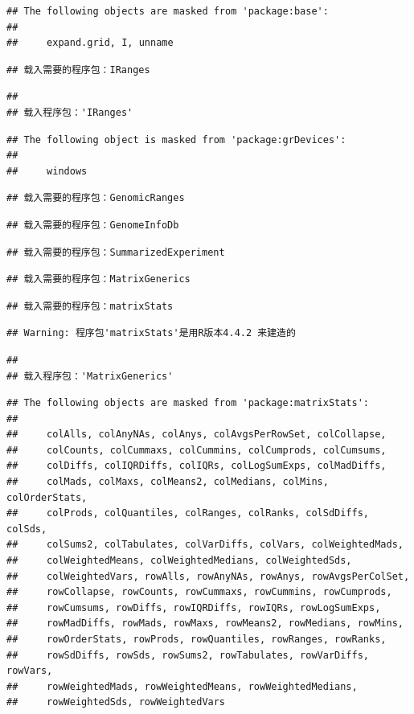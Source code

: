 \documentclass[
]{article}
\begin{document}
\begin{verbatim}
## The following objects are masked from 'package:base':
## 
##     expand.grid, I, unname
\end{verbatim}

\begin{verbatim}
## 载入需要的程序包：IRanges
\end{verbatim}

\begin{verbatim}
## 
## 载入程序包：'IRanges'
\end{verbatim}

\begin{verbatim}
## The following object is masked from 'package:grDevices':
## 
##     windows
\end{verbatim}

\begin{verbatim}
## 载入需要的程序包：GenomicRanges
\end{verbatim}

\begin{verbatim}
## 载入需要的程序包：GenomeInfoDb
\end{verbatim}

\begin{verbatim}
## 载入需要的程序包：SummarizedExperiment
\end{verbatim}

\begin{verbatim}
## 载入需要的程序包：MatrixGenerics
\end{verbatim}

\begin{verbatim}
## 载入需要的程序包：matrixStats
\end{verbatim}

\begin{verbatim}
## Warning: 程序包'matrixStats'是用R版本4.4.2 来建造的
\end{verbatim}

\begin{verbatim}
## 
## 载入程序包：'MatrixGenerics'
\end{verbatim}

\begin{verbatim}
## The following objects are masked from 'package:matrixStats':
## 
##     colAlls, colAnyNAs, colAnys, colAvgsPerRowSet, colCollapse,
##     colCounts, colCummaxs, colCummins, colCumprods, colCumsums,
##     colDiffs, colIQRDiffs, colIQRs, colLogSumExps, colMadDiffs,
##     colMads, colMaxs, colMeans2, colMedians, colMins, colOrderStats,
##     colProds, colQuantiles, colRanges, colRanks, colSdDiffs, colSds,
##     colSums2, colTabulates, colVarDiffs, colVars, colWeightedMads,
##     colWeightedMeans, colWeightedMedians, colWeightedSds,
##     colWeightedVars, rowAlls, rowAnyNAs, rowAnys, rowAvgsPerColSet,
##     rowCollapse, rowCounts, rowCummaxs, rowCummins, rowCumprods,
##     rowCumsums, rowDiffs, rowIQRDiffs, rowIQRs, rowLogSumExps,
##     rowMadDiffs, rowMads, rowMaxs, rowMeans2, rowMedians, rowMins,
##     rowOrderStats, rowProds, rowQuantiles, rowRanges, rowRanks,
##     rowSdDiffs, rowSds, rowSums2, rowTabulates, rowVarDiffs, rowVars,
##     rowWeightedMads, rowWeightedMeans, rowWeightedMedians,
##     rowWeightedSds, rowWeightedVars
\end{verbatim}
\end{document}
